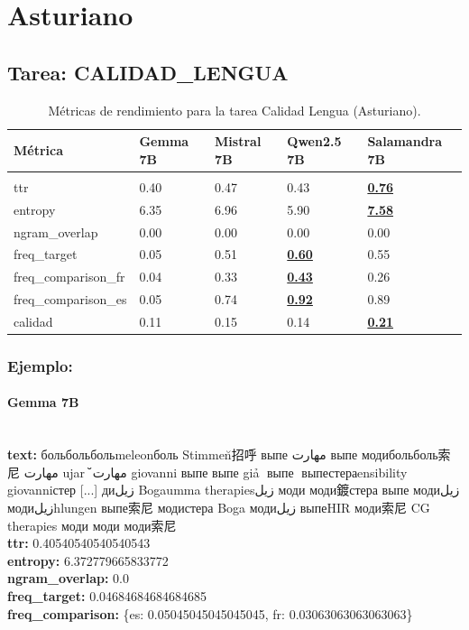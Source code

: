 \section{Asturiano}

\subsection{Tarea: CALIDAD\_LENGUA}\label{tarea-calidad_lengua}
\begin{longtable}[]{@{}lllll@{}}
\toprule\noalign{}
Métrica & Gemma 7B & Mistral 7B & Qwen2.5 7B & Salamandra 7B \\
\midrule\noalign{}
\endhead
\bottomrule\noalign{}
\caption{Métricas de rendimiento para la tarea Calidad Lengua (Asturiano).}
\label{tab:metricas_calidad_lengua_Asturiano}\\
\endlastfoot
ttr & 0.40 & 0.47 & 0.43 & \textbf{\underline{0.76}} \\
entropy & 6.35 & 6.96 & 5.90 & \textbf{\underline{7.58}} \\
ngram\_overlap & 0.00 & 0.00 & 0.00 & 0.00 \\
freq\_target & 0.05 & 0.51 & \textbf{\underline{0.60}} & 0.55 \\
freq\_comparison\_fr & 0.04 & 0.33 & \textbf{\underline{0.43}} & 0.26 \\
freq\_comparison\_es & 0.05 & 0.74 & \textbf{\underline{0.92}} & 0.89 \\
calidad & 0.11 & 0.15 & 0.14 & \textbf{\underline{0.21}} \\
\end{longtable}

\subsubsection{Ejemplo:}

\paragraph{Gemma 7B}~\\
\textbf{text:} больбольбольmeleonболь Stimmen̆招呼 выпе مهارت выпе модибольболь索尼 مهارت ujar🥈 مهارت̆ giovanni выпе выпе giả🥈 выпе🥈 выпестераensibility giovanniстер [...] диزيل Bogaumma therapiesزيل моди моди鍍стера выпе модиزيل модиزيلhlungen выпе索尼 модистера Boga модиزيل выпеHIR моди索尼 CG therapies моди моди моди索尼\\
\textbf{ttr:} 0.40540540540540543\\
\textbf{entropy:} 6.372779665833772\\
\textbf{ngram\_overlap:} 0.0\\
\textbf{freq\_target:} 0.04684684684684685\\
\textbf{freq\_comparison:} \{\textquotesingle{}es\textquotesingle{}: 0.05045045045045045, \textquotesingle{}fr\textquotesingle{}: 0.03063063063063063\}

